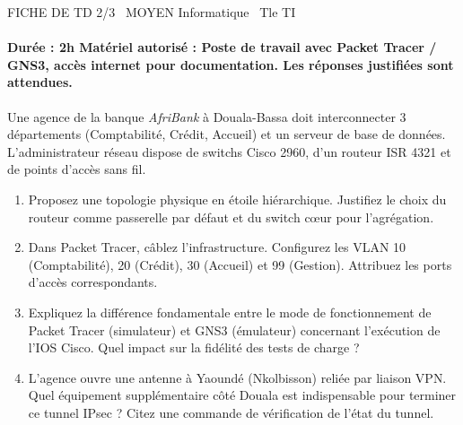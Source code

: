 \documentclass[11pt]{article}
\begin{document}
\begin{tcolorbox}[enhanced,colback=popink,colframe=popink,arc=10pt,boxrule=0pt,left=12pt,right=12pt,top=9pt,bottom=9pt]
{\color{white}\popxbold\small FICHE DE TD 2/3 \textbullet\ MOYEN \hfill Informatique \textbullet\ Tle TI\par}
\end{tcolorbox}
\vspace{4pt}
\paragraph{Durée : 2h \quad Matériel autorisé : Poste de travail avec Packet Tracer / GNS3, accès internet pour documentation. Les réponses justifiées sont attendues.}

\begin{exercice}
Une agence de la banque \textit{AfriBank} à Douala-Bassa doit interconnecter 3 départements (Comptabilité, Crédit, Accueil) et un serveur de base de données. L'administrateur réseau dispose de switchs Cisco 2960, d'un routeur ISR 4321 et de points d'accès sans fil.
\begin{enumerate}
    \item Proposez une topologie physique en étoile hiérarchique. Justifiez le choix du routeur comme passerelle par défaut et du switch cœur pour l'agrégation.
    \item Dans Packet Tracer, câblez l'infrastructure. Configurez les VLAN 10 (Comptabilité), 20 (Crédit), 30 (Accueil) et 99 (Gestion). Attribuez les ports d'accès correspondants.
    \item Expliquez la différence fondamentale entre le mode de fonctionnement de Packet Tracer (simulateur) et GNS3 (émulateur) concernant l'exécution de l'IOS Cisco. Quel impact sur la fidélité des tests de charge ?
    \item L'agence ouvre une antenne à Yaoundé (Nkolbisson) reliée par liaison VPN. Quel équipement supplémentaire côté Douala est indispensable pour terminer ce tunnel IPsec ? Citez une commande de vérification de l'état du tunnel.
\end{enumerate}
\end{exercice}
\end{document}
